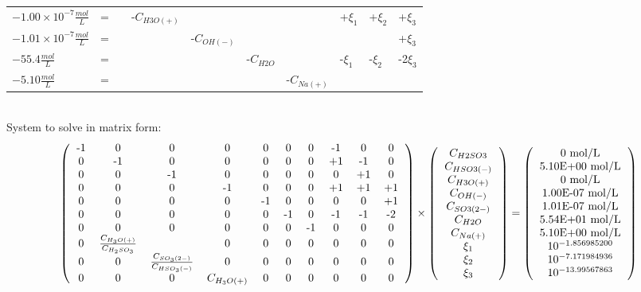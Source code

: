 \documentclass[preview]{standalone}
\begin{document}
\begin{landscape}
\begin{tabular}{llllllllll}
$-1.00 \times 10^{-7} \frac{mol}{L}$ &=  &  & -$C_{H3O(+)}$ &  &  &  & +$\xi_1$ & +$\xi_2$ & +$\xi_3$  \\
$-1.01 \times 10^{-7} \frac{mol}{L}$  &= &  &  & -$C_{OH(-)}$ &  &  &  & & +$\xi_3$ \\
$-55.4 \frac{mol}{L}$  &= &  &  &  & -$C_{H2O}$ &  & -$\xi_1$ & -$\xi_2$ & -2$\xi_3$ \\
$-5.10\frac{mol}{L}$ &= &  &  &  &  & -$C_{Na(+)}$ &  &  & \\
\end{tabular} 
\\
System to solve in matrix form:
\\
\[
\left(
\begin{tabular}{cccccccccc}
-1 & 0 & 0 & 0 & 0 & 0 & 0 & -1 & 0 & 0 \\
0 & -1 & 0 & 0 & 0 & 0 & 0 & +1 & -1 & 0 \\
0 & 0 & -1 & 0 & 0 & 0 & 0 & 0 & +1 & 0 \\
0 & 0 & 0 & -1 & 0 & 0 & 0 & +1 & +1 & +1 \\
0 & 0 & 0 & 0 & -1 & 0 & 0 & 0 & 0 & +1 \\
0 & 0 & 0 & 0 & 0 & -1 & 0 & -1 & -1 & -2 \\
0 & 0 & 0 & 0 & 0 & 0 & -1 & 0 & 0 & 0 \\
0 & $\frac{C_{H_3O(+)}}{C_{H_2SO_3}}$ &  
& 0 & 0 & 0 & 0 & 0 & 0 & 0 \\
0 & 0 & $\frac{C_{SO_3(2-)}}{C_{HSO_3(-)}}$ & 
0 & 0 & 0 & 0 & 0 & 0 & 0\\
0 & 0 & 0 & $C_{H_3O(+)}$ & 0 & 0 & 0 & 0 & 0 & 0
\end{tabular}
\right)
\times
\left(
\begin{tabular}{c}
$C_{H2SO3}$ \\
$C_{HSO3(-)}$ \\
$C_{H3O(+)}$ \\
$C_{OH(-)}$ \\
$C_{SO3(2-)}$ \\
$C_{H2O}$ \\
$C_{Na(+)}$ \\
$\xi_1$ \\
$\xi_2$ \\
$\xi_3$ \\
\end{tabular}
\right)
=
\left(
\begin{tabular}{c}
0 mol/L\\ 
5.10E+00 mol/L \\ 
0 mol/L \\ 
1.00E-07 mol/L \\ 
1.01E-07 mol/L \\ 
5.54E+01 mol/L \\ 
5.10E+00 mol/L \\ 
$10^{-1.856985200}$ \\
$10^{-7.171984936}$ \\
$10^{-13.99567863}$ \\
\end{tabular}
\right)
\]
\\ 
\end{landscape}
\end{document}
